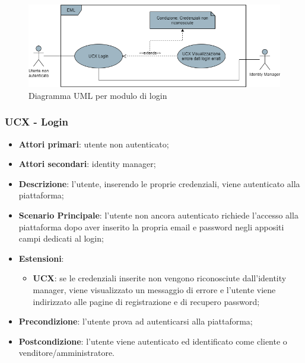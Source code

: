 \begin{figure}[H]
\centering
\includegraphics[scale=0.6]{res/UseCase/Immagini/Login}
\caption{Diagramma UML per modulo di login}
\end{figure}

\subsubsection{UCX - Login}
\begin{itemize}
\item \textbf{Attori primari}: utente non autenticato;
\item \textbf{Attori secondari}: identity manager;
\item \textbf{Descrizione}: l'utente, inserendo le proprie credenziali, viene autenticato alla piattaforma;
\item \textbf{Scenario Principale}: l'utente non ancora autenticato richiede l'accesso alla piattaforma dopo aver inserito la propria email e password negli appositi campi dedicati al login;
\item \textbf{Estensioni}:
\begin{itemize}
\item \textbf{UCX}: se le credenziali inserite non vengono riconosciute dall'identity manager, viene visualizzato un messaggio di errore e l'utente viene indirizzato alle pagine di registrazione e di recupero password;
\end{itemize}
\item \textbf{Precondizione}: l'utente prova ad autenticarsi alla piattaforma;
\item \textbf{Postcondizione}: l'utente viene autenticato ed identificato come cliente o venditore/amministratore.
\end{itemize}

